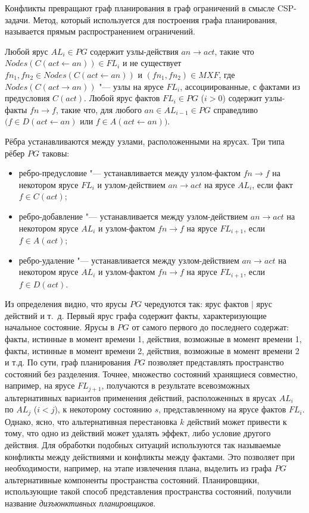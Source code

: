 \documentclass[b5paper,11pt]{book}
\numberwithin{Def}{section}
\numberwithin{Th}{chapter}
\numberwithin{St}{chapter}
\begin{document}
	Конфликты превращают граф планирования в граф ограничений в смысле CSP-задачи. Метод, который используется для построения графа планирования, называется прямым распространением ограничений.
	
	Любой ярус $AL_i\in PG$ содержит узлы-действия $an\rightarrow act$, такие что $Nodes(C(act\leftarrow an))\in FL_i$ и не существует $fn_1,fn_2\in Nodes(C(act\leftarrow an))$ и $(fn_1, fn_2)\in MXF$, где $Nodes(C(act\rightarrow an))$ "--- узлы на ярусе $FL_i$, ассоциированные, с фактами из предусловия $C(act)$. Любой ярус фактов $FL_i\in PG$ ($i>0$) содержит узлы-факты $fn\rightarrow f$, такие что, для любого $an\in AL_{i-1}\in PG$ справедливо $(f\in D(act\leftarrow an)$ или $f\in A(act\leftarrow an))$.
	
	Рёбра устанавливаются между узлами, расположенными на ярусах. Три типа рёбер $PG$ таковы:
	\begin{itemize}
		\item ребро-предусловие "--- устанавливается между узлом-фактом $fn\rightarrow f$ на некотором ярусе $FL_i$ и узлом-действием $an\rightarrow act$ на ярусе $AL_i$, если факт $f\in C(act)$;
		\item ребро-добавление "--- устанавливается между узлом-действием $an\rightarrow act$ на некотором ярусе $AL_i$ и узлом-фактом $fn\rightarrow f$ на ярусе $FL_{i+1}$, если $f\in A(act)$;
		\item ребро-удаление "--- устанавливается между узлом-действием $an\rightarrow act$ на некотором ярусе $AL_i$ и узлом-фактом $fn\rightarrow f$ на ярусе $FL_{i+1}$, если $f\in D(act)$.
	\end{itemize}

	Из определения видно, что ярусы $PG$ чередуются так: ярус фактов $|$ ярус действий и т.~д. Первый ярус графа содержит факты, характеризующие начальное состояние. Ярусы в $PG$ от самого первого до последнего содержат: факты, истинные в момент времени 1, действия, возможные в момент времени 1, факты, истинные в момент времени 2, действия, возможные в момент времени 2 и т.д. По сути, граф планирования $PG$ позволяет представлять пространство состояний без разделения. Точнее, множество состояний хранящиеся совместно, например, на ярусе $FL_{j+1}$, получаются в результате всевозможных альтернативных вариантов применения действий, расположенных в ярусах $AL_i$ по $AL_j$ ($i<j$), к некоторому состоянию $s$, представленному на ярусе фактов $FL_i$. Однако, ясно, что альтернативная перестановка $k$ действий может привести к тому, что одно из действий может удалять эффект, либо условие другого действия. Для обработки подобных ситуаций используются так называемые  конфликты между действиями и конфликты между фактами. Это позволяет при необходимости, например, на этапе извлечения плана, выделить из графа $PG$ альтернативные компоненты пространства состояний. Планировщики, использующие такой способ представления пространства состояний, получили название \textit{дизъюнктивных планировщиков}. 
	
\end{document}
